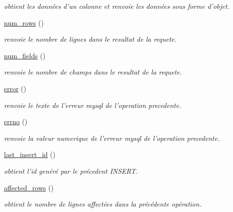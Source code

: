 \begin{CompactItemize}
\begin{CompactList}\small\item\em obtient les donn\'{e}es d'un colonne et renvoie les donn\'{e}es sous forme d'objet. \item\end{CompactList}\item 
\hyperlink{classDoliDb_a21}{num\_\-rows} ()
\begin{CompactList}\small\item\em renvoie le nombre de lignes dans le resultat de la requete. \item\end{CompactList}\item 
\hyperlink{classDoliDb_a22}{num\_\-fields} ()
\begin{CompactList}\small\item\em renvoie le nombre de champs dans le resultat de la requete. \item\end{CompactList}\item 
\hyperlink{classDoliDb_a23}{error} ()
\begin{CompactList}\small\item\em renvoie le texte de l'erreur mysql de l'operation precedente. \item\end{CompactList}\item 
\hyperlink{classDoliDb_a24}{errno} ()
\begin{CompactList}\small\item\em renvoie la valeur numerique de l'erreur mysql de l'operation precedente. \item\end{CompactList}\item 
\hyperlink{classDoliDb_a25}{last\_\-insert\_\-id} ()
\begin{CompactList}\small\item\em obtient l'id gen\'{e}r\'{e} par le pr\'{e}cedent INSERT. \item\end{CompactList}\item 
\hyperlink{classDoliDb_a26}{affected\_\-rows} ()
\begin{CompactList}\small\item\em obtient le nombre de lignes affect\'{e}es dans la pr\'{e}c\'{e}dente op\'{e}ration. \item\end{CompactList}\end{CompactItemize}


